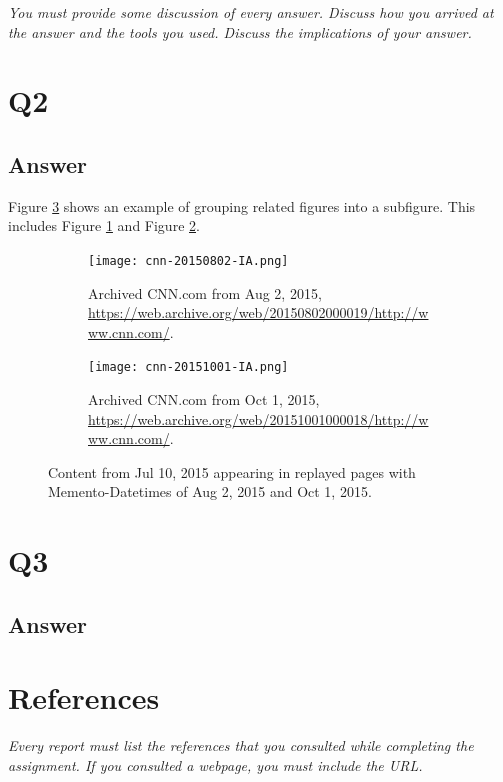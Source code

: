 \documentclass[12pt]{article}
\begin{document}
\emph{You must provide some discussion of every answer. Discuss how you arrived at the answer and the tools you used. Discuss the implications of your answer.}

\section*{Q2}

\subsection*{Answer}

Figure \ref{fig:subfigure-ex} shows an example of grouping related figures into a subfigure.  This includes Figure \ref{fig:cnn-2015aug02} and Figure \ref{fig:cnn-2015oct01}.
\begin{figure}[ht]
\centering
\begin{subfigure}{0.45\textwidth}
  \centering
  \texttt{[image: cnn-20150802-IA.png]}
  \caption{Archived CNN.com from Aug 2, 2015, \url{https://web.archive.org/web/20150802000019/http://www.cnn.com/}.}
\label{fig:cnn-2015aug02}
\end{subfigure}
\hspace{20pt}
\begin{subfigure}{0.45\textwidth}
  \centering
  \texttt{[image: cnn-20151001-IA.png]}
  \caption{Archived CNN.com from Oct 1, 2015, \url{https://web.archive.org/web/20151001000018/http://www.cnn.com/}.}
\label{fig:cnn-2015oct01}
\end{subfigure}%
\caption{Content from Jul 10, 2015 appearing in replayed pages with Memento-Datetimes of Aug 2, 2015 and Oct 1, 2015.}
\label{fig:subfigure-ex}
\end{figure}

\section*{Q3}

\subsection*{Answer}

\section*{References}

\emph{Every report must list the references that you consulted while completing the assignment. If you consulted a webpage, you must include the URL.}
\end{document}
